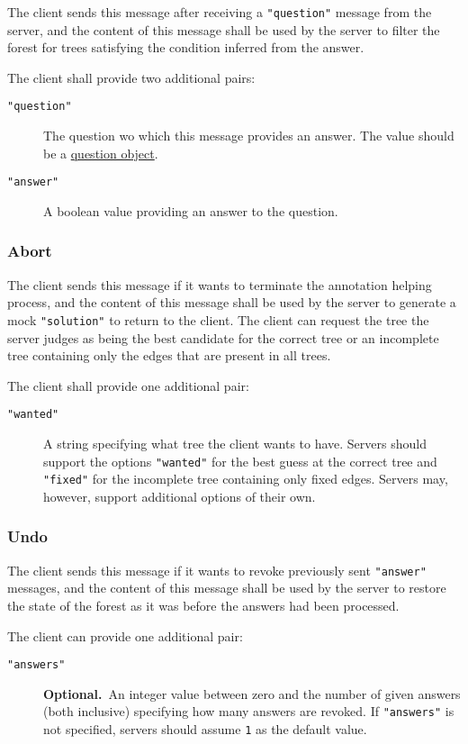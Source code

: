 \documentclass{scrartcl}
\newcommand{\jsstring}[1]{\texttt{\color{OrangeRed}"#1"}}
\newcommand{\js}[1]{\lstinline[style=JSONInputStyle];#1;}
\newcommand{\optional}{\textbf{Optional.}}
\begin{document}
The client sends this message after receiving a \jsstring{question} message from the server,
and the content of this message shall be used by the server to filter the forest for trees satisfying
the condition inferred from the answer.

The client shall provide two additional pairs:
\begin{description}
    \item[\jsstring{question}] The question wo which this message provides an answer.
        The value should be a \hyperref[ssub:Question object]{question object}.
    \item[\jsstring{answer}] A boolean value providing an answer to the question.
\end{description}

\subsubsection{Abort}
\label{ssub:Abort}

The client sends this message if it wants to terminate the annotation helping process,
and the content of this message shall be used by the server to generate a mock \jsstring{solution} to return to the client.
The client can request the tree the server judges as being the best candidate for the correct tree or an incomplete tree containing only the edges that are present in all trees.

The client shall provide one additional pair:
\begin{description}
    \item[\jsstring{wanted}] A string specifying what tree the client wants to have.
        Servers should support the options \jsstring{wanted} for the best guess at the correct tree and \jsstring{fixed} for the incomplete tree containing only fixed edges.
        Servers may, however, support additional options of their own.
\end{description}

\subsubsection{Undo}
\label{ssub:Undo}

The client sends this message if it wants to revoke previously sent \jsstring{answer} messages,
and the content of this message shall be used by the server to restore the state of the forest as it was before the answers had been processed.

The client can provide one additional pair:
\begin{description}
    \item[\jsstring{answers}] \optional\ An integer value between zero and the number of given answers (both inclusive) specifying how many answers are revoked.
        If \jsstring{answers} is not specified, servers should assume \js{1} as the default value.
\end{description}
\end{document}
